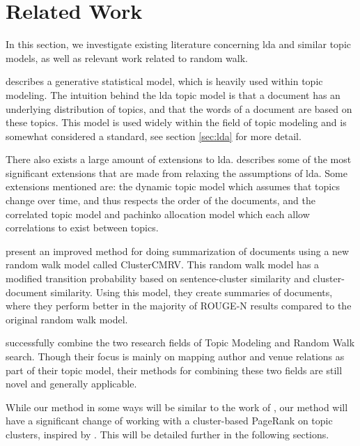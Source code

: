 \section{Related Work}\label{sec:related-works} 
In this section, we investigate existing literature concerning \gls{lda} and similar topic models, as well as relevant work related to random walk.

\citet{lda} describes a generative statistical model, which is heavily used within topic modeling. 
The intuition behind the \gls{lda} topic model is that a document has an underlying distribution of topics, and that the words of a document are based on these topics.
This model is used widely within the field of topic modeling and is somewhat considered a standard, see section \autoref{sec:lda} for more detail.

There also exists a large amount of extensions to \gls{lda}.
\citet{blei2012topicmodels} describes some of the most significant extensions that are made from relaxing the assumptions of \gls{lda}.
Some extensions mentioned are: the dynamic topic model\cite{blei2006dynamic} which assumes that topics change over time, and thus respects the order of the documents, and the correlated topic model\cite{blei2007correlated} and pachinko allocation model\cite{li2006pachinko} which each allow correlations to exist between topics.

\citet{ClusterPageRank} present an improved method for doing summarization of documents using a new random walk model called ClusterCMRV. 
This random walk model has a modified transition probability based on sentence-cluster similarity and cluster-document similarity.
Using this model, they create summaries of documents, where they perform better in the majority of ROUGE-N results compared to the original random walk model.

\citet{Tang2008} successfully combine the two research fields of Topic Modeling and Random Walk search. Though their focus is mainly on mapping author and venue relations as part of their topic model, their methods for combining these two fields are still novel and generally applicable.

While our method in some ways will be similar to the work of \citeauthor{Tang2008}, our method will have a significant change of working with a cluster-based PageRank on topic clusters, inspired by \cite{ClusterPageRank}.
This will be detailed further in the following sections.

